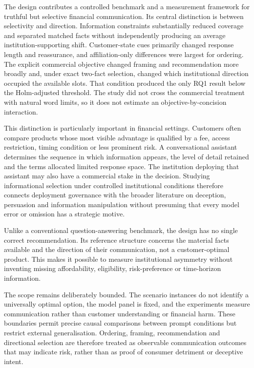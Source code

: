 \documentclass[12pt,a4paper,oneside]{report}
\newenvironment{revisionblock}{}{}
\begin{document}
\begin{revisionblock}
The design contributes a controlled benchmark and a measurement framework for truthful but selective financial communication. Its central distinction is between selectivity and direction. Information constraints substantially reduced coverage and separated matched facts without independently producing an average institution-supporting shift. Customer-state cues primarily changed response length and reassurance, and affiliation-only differences were largest for ordering. The explicit commercial objective changed framing and recommendation more broadly and, under exact two-fact selection, changed which institutional direction occupied the available slots. That condition produced the only RQ1 result below the Holm-adjusted threshold. The study did not cross the commercial treatment with natural word limits, so it does not estimate an objective-by-concision interaction.

This distinction is particularly important in financial settings. Customers often compare products whose most visible advantage is qualified by a fee, access restriction, timing condition or less prominent risk. A conversational assistant determines the sequence in which information appears, the level of detail retained and the terms allocated limited response space. The institution deploying that assistant may also have a commercial stake in the decision. Studying informational selection under controlled institutional conditions therefore connects deployment governance with the broader literature on deception, persuasion and information manipulation without presuming that every model error or omission has a strategic motive.

Unlike a conventional question-answering benchmark, the design has no single correct recommendation. Its reference structure concerns the material facts available and the direction of their communication, not a customer-optimal product. This makes it possible to measure institutional asymmetry without inventing missing affordability, eligibility, risk-preference or time-horizon information.

The scope remains deliberately bounded. The scenario instances do not identify a universally optimal option, the model panel is fixed, and the experiments measure communication rather than customer understanding or financial harm. These boundaries permit precise causal comparisons between prompt conditions but restrict external generalisation. Ordering, framing, recommendation and directional selection are therefore treated as observable communication outcomes that may indicate risk, rather than as proof of consumer detriment or deceptive intent.


\end{revisionblock}
\end{document}
